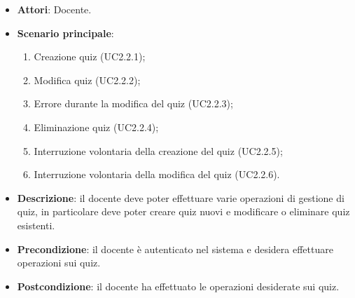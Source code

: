 \begin{itemize}
\item \textbf{Attori}: Docente.
\item \textbf{Scenario principale}:
\begin{enumerate}
\item Creazione quiz (UC2.2.1);
\item Modifica quiz (UC2.2.2);
\item Errore durante la modifica del quiz (UC2.2.3);
\item Eliminazione quiz (UC2.2.4);
\item Interruzione volontaria della creazione del quiz (UC2.2.5);
\item Interruzione volontaria della modifica del quiz (UC2.2.6).
\end{enumerate}
\item \textbf{Descrizione}: il docente deve poter effettuare varie operazioni di gestione di quiz, in particolare deve poter creare quiz nuovi e modificare o eliminare quiz esistenti.
\item \textbf{Precondizione}: il docente è autenticato nel sistema e desidera effettuare operazioni sui quiz.
\item \textbf{Postcondizione}: il docente ha effettuato le operazioni desiderate sui quiz.
\end{itemize}
